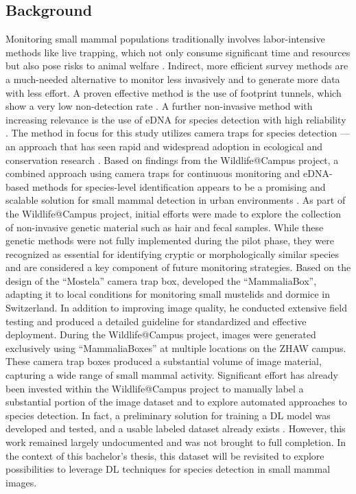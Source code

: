 \subsection{Background}
Monitoring small mammal populations traditionally involves labor-intensive methods like live trapping, which not only consume significant time and resources but also pose risks to animal welfare \autocite{grafWildlifeCampusKleineSaeugetiere2022}.
Indirect, more efficient survey methods are a much-needed alternative to monitor less invasively and to generate more data with less effort.
A proven effective method is the use of footprint tunnels, which show a very low non-detection rate \autocite{yarnellUsingOccupancyAnalysis2014}.
A further non-invasive method with increasing relevance is the use of \ac{eDNA} for species detection with high reliability \autocite{thomsenEnvironmentalDNAEmerging2015}.
The method in focus for this study utilizes camera traps for species detection --- an approach that has seen rapid and widespread adoption in ecological and conservation research \autocite{delisleNextGenerationCameraTrapping2021}.
Based on findings from the Wildlife@Campus project, a combined approach using camera traps for continuous monitoring and \acs{eDNA}-based methods for species-level identification appears to be a promising and scalable solution for small mammal detection in urban environments \autocite{grafWildlifeCampusKleineSaeugetiere2022}.
As part of the Wildlife@Campus project, initial efforts were made to explore the collection of non-invasive genetic material such as hair and fecal samples.
While these genetic methods were not fully implemented during the pilot phase, they were recognized as essential for identifying cryptic or morphologically similar species and are considered a key component of future monitoring strategies.
Based on the design of the \enquote{Mostela} camera trap box, \textcite{aegerterMonitoringKleinmustelidenSchlaefern2019} developed the \enquote{MammaliaBox}, adapting it to local conditions for monitoring small mustelids and dormice in Switzerland.
In addition to improving image quality, he conducted extensive field testing and produced a detailed guideline for standardized and effective deployment.
During the Wildlife@Campus project, images were generated exclusively using \enquote{MammaliaBoxes} at multiple locations on the ZHAW campus. 
These camera trap boxes produced a substantial volume of image material, capturing a wide range of small mammal activity.
Significant effort has already been invested within the Wildlife@Campus project to manually label a substantial portion of the image dataset and to explore automated approaches to species detection.
In fact, a preliminary solution for training a \ac{DL} model was developed and tested, and a usable labeled dataset already exists \autocite{ratnaweeraWildlifeCampusProgressReports2021}.
However, this work remained largely undocumented and was not brought to full completion. 
In the context of this bachelor's thesis, this dataset will be revisited to explore possibilities to leverage \ac{DL} techniques for species detection in small mammal images.

